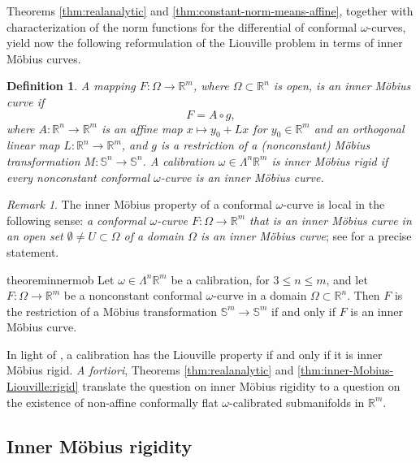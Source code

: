 \documentclass[a4paper,leqno,11pt]{amsart}
\numberwithin{equation}{section}
\newtheorem*{definition*}{Definition}
\theoremstyle{remark}
\newtheorem*{remark*}{Remark}
\theoremstyle{remark}
\renewcommand{\S}{\mathbb{S}}
\newcommand{\R}{\mathbb{R}}
\begin{document}
Theorems \ref{thm:realanalytic} and \ref{thm:constant-norm-means-affine}, together with characterization of the norm functions for the differential of conformal $\omega$-curves, yield now the following reformulation of the Liouville problem in terms of inner M\"obius curves.

\begin{definition*}
A mapping $F \colon \Omega \to \R^m$, where $\Omega \subset \R^n$ is open, is an \emph{inner Möbius curve} if
\begin{equation*}
    F = A \circ g,
\end{equation*}
where $A \colon \R^n \to \R^m$ is an affine map $x \mapsto y_0 + L x$ for $y_0 \in \R^m$ and an orthogonal linear map $L \colon \R^n \to \R^m$, and $g$ is a restriction of a (nonconstant) Möbius transformation $M \colon \S^n \to \S^n$. A calibration $\omega \in \Lambda^n \R^m$ is \emph{inner M\"obius rigid} if every nonconstant conformal $\omega$-curve is an inner M\"obius curve.
\end{definition*}

\begin{remark*}
The inner M\"obius property of a conformal $\omega$-curve is local in the following sense: \emph{a conformal $\omega$-curve $F \colon \Omega \to \R^m$ that is an inner M\"obius curve in an open set $\emptyset \neq U \subset \Omega$ of a domain $\Omega$ is an inner M\"obius curve}; see  for a precise statement.
\end{remark*}


\begin{restatable}{theorem}{innermob}
\label{thm:inner-Mobius-Liouville:rigid}
Let $\omega \in \Lambda^n \R^m$ be a calibration, for $3 \leq n \leq m$, and let $F \colon \Omega \to \R^m$ be a nonconstant conformal $\omega$-curve in a domain $\Omega \subset \R^n$. Then $F$ is the restriction of a Möbius transformation $\S^m \to \S^m$ if and only if $F$ is an inner Möbius curve.
\end{restatable}



In light of , a calibration has the Liouville property if and only if it is inner Möbius rigid. \emph{A fortiori}, Theorems \ref{thm:realanalytic} and \ref{thm:inner-Mobius-Liouville:rigid} translate the question on inner M\"obius rigidity to a question on the existence of non-affine conformally flat $\omega$-calibrated submanifolds in $\R^m$.


\subsection{Inner M\"obius rigidity}
\end{document}
